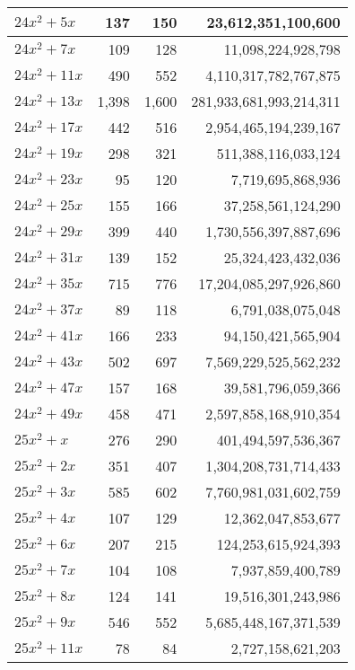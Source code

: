 \documentclass[a4paper]{amsproc}
\theoremstyle{plain}
\begin{document}
\begin{longtable}{ | l | r | r | r | }
$24x^2 + 5x$ & 137 & 150 & 23{,}612{,}351{,}100{,}600 \\ \hline
$24x^2 + 7x$ & 109 & 128 & 11{,}098{,}224{,}928{,}798 \\ \hline
$24x^2 + 11x$ & 490 & 552 & 4{,}110{,}317{,}782{,}767{,}875 \\ \hline
$24x^2 + 13x$ & 1{,}398 & 1{,}600 & 281{,}933{,}681{,}993{,}214{,}311 \\ \hline
$24x^2 + 17x$ & 442 & 516 & 2{,}954{,}465{,}194{,}239{,}167 \\ \hline
$24x^2 + 19x$ & 298 & 321 & 511{,}388{,}116{,}033{,}124 \\ \hline
$24x^2 + 23x$ & 95 & 120 & 7{,}719{,}695{,}868{,}936 \\ \hline
$24x^2 + 25x$ & 155 & 166 & 37{,}258{,}561{,}124{,}290 \\ \hline
$24x^2 + 29x$ & 399 & 440 & 1{,}730{,}556{,}397{,}887{,}696 \\ \hline
$24x^2 + 31x$ & 139 & 152 & 25{,}324{,}423{,}432{,}036 \\ \hline
$24x^2 + 35x$ & 715 & 776 & 17{,}204{,}085{,}297{,}926{,}860 \\ \hline
$24x^2 + 37x$ & 89 & 118 & 6{,}791{,}038{,}075{,}048 \\ \hline
$24x^2 + 41x$ & 166 & 233 & 94{,}150{,}421{,}565{,}904 \\ \hline
$24x^2 + 43x$ & 502 & 697 & 7{,}569{,}229{,}525{,}562{,}232 \\ \hline
$24x^2 + 47x$ & 157 & 168 & 39{,}581{,}796{,}059{,}366 \\ \hline
$24x^2 + 49x$ & 458 & 471 & 2{,}597{,}858{,}168{,}910{,}354 \\ \hline
$25x^2 + x$ & 276 & 290 & 401{,}494{,}597{,}536{,}367 \\ \hline
$25x^2 + 2x$ & 351 & 407 & 1{,}304{,}208{,}731{,}714{,}433 \\ \hline
$25x^2 + 3x$ & 585 & 602 & 7{,}760{,}981{,}031{,}602{,}759 \\ \hline
$25x^2 + 4x$ & 107 & 129 & 12{,}362{,}047{,}853{,}677 \\ \hline
$25x^2 + 6x$ & 207 & 215 & 124{,}253{,}615{,}924{,}393 \\ \hline
$25x^2 + 7x$ & 104 & 108 & 7{,}937{,}859{,}400{,}789 \\ \hline
$25x^2 + 8x$ & 124 & 141 & 19{,}516{,}301{,}243{,}986 \\ \hline
$25x^2 + 9x$ & 546 & 552 & 5{,}685{,}448{,}167{,}371{,}539 \\ \hline
$25x^2 + 11x$ & 78 & 84 & 2{,}727{,}158{,}621{,}203 \\ \hline

\end{longtable}
\end{document}
